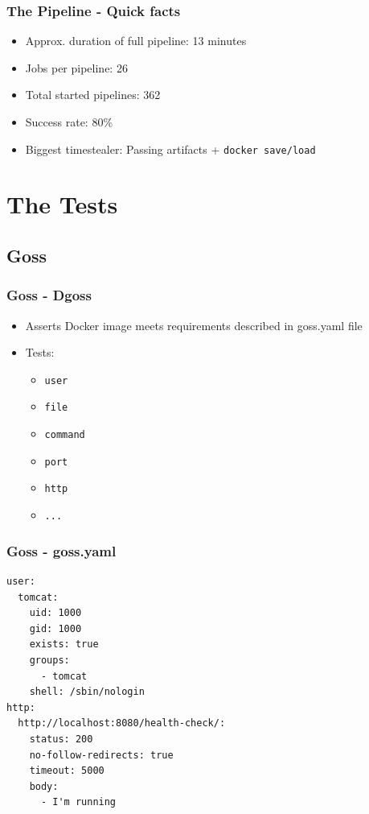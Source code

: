 \documentclass[14pt,aspectratio=169]{beamer}
\begin{document}
\begin{frame}
  \frametitle{The Pipeline - Quick facts}
  \begin{itemize}
    \item Approx. duration of full pipeline: 13 minutes
    \item Jobs per pipeline: 26
    \item Total started pipelines: 362
    \item Success rate: 80\%
    \item Biggest timestealer: Passing artifacts + \texttt{docker save/load}
  \end{itemize}
\end{frame}

\section{The Tests}

\subsection{Goss}

\begin{frame}
  \frametitle{Goss - Dgoss}
  \begin{itemize}
    \item Asserts Docker image meets requirements described in goss.yaml file
    \item Tests:
    \begin{itemize}
    \item \texttt{user}
    \item \texttt{file}
    \item \texttt{command}
    \item \texttt{port}
    \item \texttt{http}
    \item \texttt{...}
    \end{itemize}
  \end{itemize}
\end{frame}

\begin{frame}[fragile]
  \frametitle{Goss - goss.yaml}
  \begin{verbatim}
user:
  tomcat:
    uid: 1000
    gid: 1000
    exists: true
    groups:
      - tomcat
    shell: /sbin/nologin
http:
  http://localhost:8080/health-check/:
    status: 200
    no-follow-redirects: true
    timeout: 5000
    body:
      - I'm running
  \end{verbatim}
\end{frame}
\end{document}
